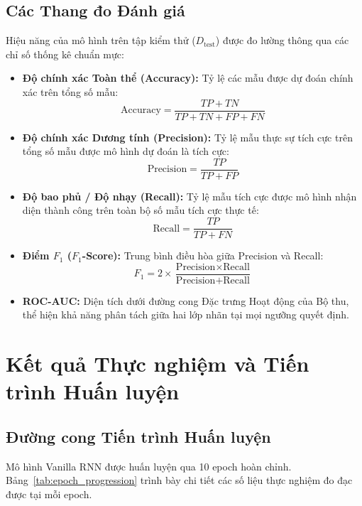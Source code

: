 \documentclass[11pt,a4paper]{article}
\begin{document}
\subsection{Các Thang đo Đánh giá}
Hiệu năng của mô hình trên tập kiểm thử ($D_{\text{test}}$) được đo lường thông qua các chỉ số thống kê chuẩn mực:
\begin{itemize}
    \item \textbf{Độ chính xác Toàn thể (Accuracy):} Tỷ lệ các mẫu được dự đoán chính xác trên tổng số mẫu:
    \begin{equation}
    \text{Accuracy} = \frac{TP + TN}{TP + TN + FP + FN}
    \end{equation}
    \item \textbf{Độ chính xác Dương tính (Precision):} Tỷ lệ mẫu thực sự tích cực trên tổng số mẫu được mô hình dự đoán là tích cực:
    \begin{equation}
    \text{Precision} = \frac{TP}{TP + FP}
    \end{equation}
    \item \textbf{Độ bao phủ / Độ nhạy (Recall):} Tỷ lệ mẫu tích cực được mô hình nhận diện thành công trên toàn bộ số mẫu tích cực thực tế:
    \begin{equation}
    \text{Recall} = \frac{TP}{TP + FN}
    \end{equation}
    \item \textbf{Điểm $F_1$ ($F_1$-Score):} Trung bình điều hòa giữa Precision và Recall:
    \begin{equation}
    F_1 = 2 \times \frac{\text{Precision} \times \text{Recall}}{\text{Precision} + \text{Recall}}
    \end{equation}
    \item \textbf{ROC-AUC:} Diện tích dưới đường cong Đặc trưng Hoạt động của Bộ thu, thể hiện khả năng phân tách giữa hai lớp nhãn tại mọi ngưỡng quyết định.
\end{itemize}

\section{Kết quả Thực nghiệm và Tiến trình Huấn luyện}
\label{sec:results}

\subsection{Đường cong Tiến trình Huấn luyện}
Mô hình Vanilla RNN được huấn luyện qua 10 epoch hoàn chỉnh. Bảng~\ref{tab:epoch_progression} trình bày chi tiết các số liệu thực nghiệm đo đạc được tại mỗi epoch.
\end{document}
